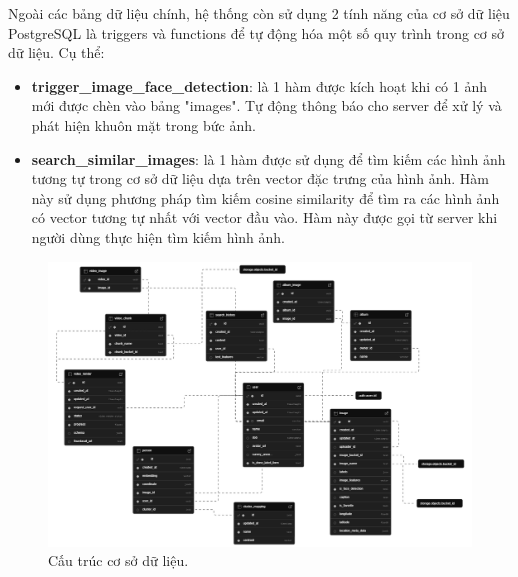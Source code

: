 Ngoài các bảng dữ liệu chính, hệ thống còn sử dụng 2 tính năng của cơ sở dữ liệu PostgreSQL là triggers và functions để tự động hóa một số quy trình trong cơ sở dữ liệu. Cụ thể:
\begin{itemize}
    \item \textbf{trigger\_image\_face\_detection}: là 1 hàm được kích hoạt khi có 1 ảnh mới được chèn vào bảng "images". Tự động thông báo cho server để xử lý và phát hiện khuôn mặt trong bức ảnh.
    
    
    \item \textbf{search\_similar\_images}: là 1 hàm được sử dụng để tìm kiếm các hình ảnh tương tự trong cơ sở dữ liệu dựa trên vector đặc trưng của hình ảnh. Hàm này sử dụng phương pháp tìm kiếm cosine similarity để tìm ra các hình ảnh có vector tương tự nhất với vector đầu vào. Hàm này được gọi từ server khi người dùng thực hiện tìm kiếm hình ảnh. 
    
\end{itemize}

\begin{figure}[H]
    \centering  
    \includegraphics[width=1\textwidth]{figures/c3/3-4-database-graph.png}
    \caption{Cấu trúc cơ sở dữ liệu.}
    \label{fig:3-4-database-diagram}
\end{figure}